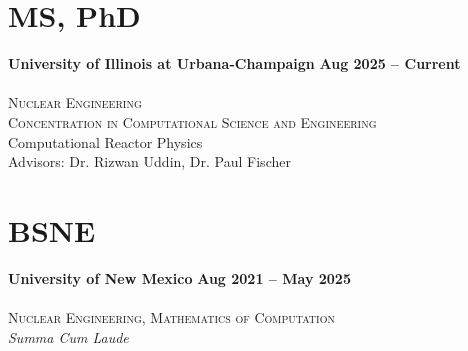 \section{\mysidestyle MS, PhD}
\textbf{University of Illinois at Urbana-Champaign} \hfill \textbf{Aug 2025 -- Current}\vspace{-3mm}\\\vspace{-1mm}\\
\textsc{Nuclear Engineering \\Concentration in Computational Science and Engineering}\hfill \\
\hspace*{2mm} Computational Reactor Physics \\
\hspace*{2mm} Advisors:  Dr. Rizwan Uddin, Dr. Paul Fischer

\section{\mysidestyle BSNE}
\textbf{University of New Mexico} \hfill\textbf{Aug 2021 -- May 2025}\vspace{-3mm}\\\vspace{-1mm}\\
\textsc{Nuclear Engineering, Mathematics of Computation}\hfill\\
\textit{Summa Cum Laude}

